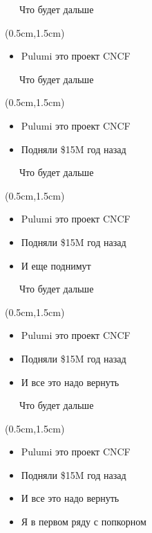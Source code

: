 \documentclass[xetex,18pt,aspectratio=43]{beamer}
\begin{document}
\begin{Large}
\begin{frame}{\ \ \ Что будет дальше}
\begin{textblock*}{\framewidth-0.8cm}(0.5cm,1.5cm)
\begin{itemize}
  \item Pulumi это проект CNCF
\end{itemize}
\end{textblock*}
\end{frame}

\begin{frame}{\ \ \ Что будет дальше}
\begin{textblock*}{\framewidth-0.8cm}(0.5cm,1.5cm)
\begin{itemize}
  \item Pulumi это проект CNCF
  \item Подняли \$15M год назад
\end{itemize}
\end{textblock*}
\end{frame}

\begin{frame}{\ \ \ Что будет дальше}
\begin{textblock*}{\framewidth-0.8cm}(0.5cm,1.5cm)
\begin{itemize}
  \item Pulumi это проект CNCF
  \item Подняли \$15M год назад
  \item И еще поднимут
\end{itemize}
\end{textblock*}
\end{frame}

\begin{frame}{\ \ \ Что будет дальше}
\begin{textblock*}{\framewidth-0.8cm}(0.5cm,1.5cm)
\begin{itemize}
  \item Pulumi это проект CNCF
  \item Подняли \$15M год назад
  \item И все это надо вернуть
\end{itemize}
\end{textblock*}
\end{frame}

\begin{frame}{\ \ \ Что будет дальше}
\begin{textblock*}{\framewidth-0.8cm}(0.5cm,1.5cm)
\begin{itemize}
  \item Pulumi это проект CNCF
  \item Подняли \$15M год назад
  \item И все это надо вернуть
  \item Я в первом ряду с попкорном
\end{itemize}
\end{textblock*}
\end{frame}


\end{Large}
\end{document}
